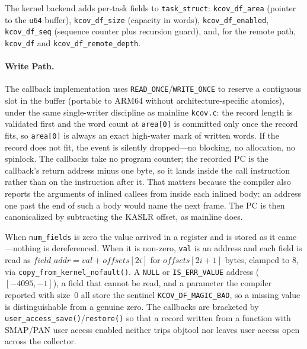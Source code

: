\documentclass{article}
\begin{document}
The kernel backend adds per-task fields to \texttt{task\_struct}:
\texttt{kcov\_df\_area} (pointer to the \texttt{u64} buffer),
\texttt{kcov\_df\_size} (capacity in words), \texttt{kcov\_df\_enabled},
\texttt{kcov\_df\_seq} (sequence counter plus recursion guard), and, for the
remote path, \texttt{kcov\_df} and \texttt{kcov\_df\_remote\_depth}.

\paragraph{Write Path.} The callback implementation uses
\texttt{READ\_ONCE}/\texttt{WRITE\_ONCE} to reserve a contiguous slot in
the buffer (portable to ARM64 without architecture-specific atomics), under the
same single-writer discipline as mainline \texttt{kcov.c}: the record length is
validated first and the word count at \texttt{area[0]} is committed only once
the record fits, so \texttt{area[0]} is always an exact high-water mark of
written words. If the record does not fit, the event is silently
dropped---no blocking, no allocation, no spinlock. The callbacks take no
program counter; the recorded PC is the callback's return address minus one
byte, so it lands inside the call instruction rather than on the instruction
after it. That matters because the compiler also reports the arguments of
inlined callees from inside each inlined body: an address one past the end of
such a body would name the next frame. The PC is then canonicalized by
subtracting the KASLR offset, as mainline \kcov{} does.

When \texttt{num\_fields} is zero the value arrived in a register and is stored
as it came---nothing is dereferenced. When it is non-zero, \texttt{val} is an
address and each field is read as
$\mathit{field\_addr} = \mathit{val} + \mathit{offsets}[2i]$ for
$\mathit{offsets}[2i+1]$ bytes, clamped to 8, via
\texttt{copy\_from\_kernel\_nofault()}. A \texttt{NULL} or
\texttt{IS\_ERR\_VALUE} address ($[-4095,-1]$), a field that cannot be read,
and a parameter the compiler reported with size~0 all store the sentinel
\texttt{KCOV\_DF\_MAGIC\_BAD}, so a missing value is distinguishable from a
genuine zero. The callbacks are bracketed by
\texttt{user\_access\_save()}/\texttt{restore()} so that a record written from
a function with SMAP/PAN user access enabled neither trips objtool nor leaves
user access open across the collector.
\end{document}
